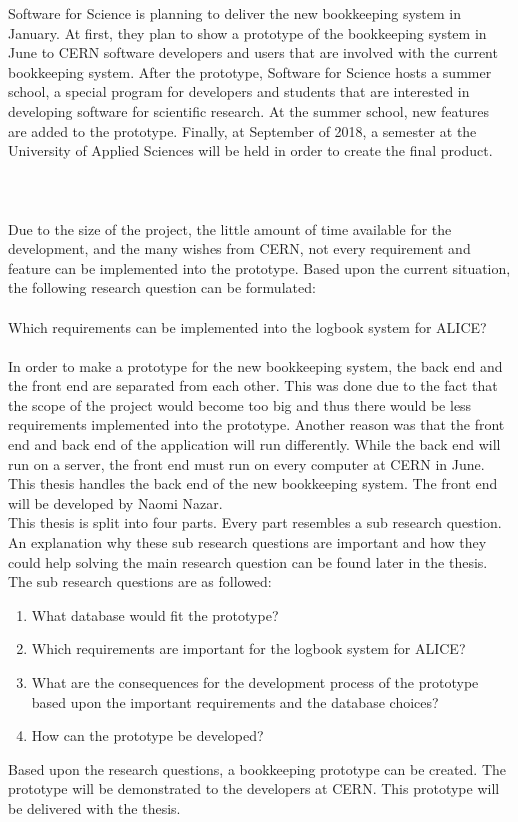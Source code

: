 \documentclass[paper=a4, fontsize=11pt,twoside]{scrartcl}	%
\begin{document}
Software for Science is planning to deliver the new bookkeeping system in January. At first, they plan to show a prototype of the bookkeeping system in June to CERN software developers and users that are involved with the current bookkeeping system. After the prototype, Software for Science hosts a summer school, a special program for developers and students that are interested in developing software for scientific research. At the summer school, new features are added to the prototype. Finally, at September of 2018, a semester at the University of Applied Sciences will be held in order to create the final product. \\ \\ \\ \\
Due to the size of the project, the little amount of time available for the development, and the many wishes from CERN, 
not every requirement and feature can be implemented into the prototype.   Based upon the current situation, the following research question can be formulated: \\ \\
Which requirements can be implemented into the logbook system for ALICE?
\\ \\
In order to make a prototype for the new bookkeeping system, the back end and the front end are separated from each other. This was done due to the fact that the scope of the project would become too big and thus there would be less requirements implemented into the prototype. Another reason was that the front end and back end of the application will run differently. While the back end will run on a server, the front end must run on every computer at CERN in June. This thesis handles the back end of the new bookkeeping system. The front end will be developed by Naomi Nazar. 
\\ 
This thesis is split into four parts. Every part resembles a sub research question. An explanation why these sub research questions are important and how they could help solving the main research question can be found later in the thesis. The sub research questions are as followed: \\
\begin{enumerate}
\item What database would fit the prototype?
\item Which requirements are important for the logbook system for ALICE?
\item What are the consequences for the development process of the prototype based upon the important requirements and the database choices?
\item How can the prototype be developed?
\end{enumerate}
Based upon the research questions, a bookkeeping prototype can be created. The prototype will be demonstrated to the developers at CERN. This prototype will be delivered with the thesis. 
\end{document}
